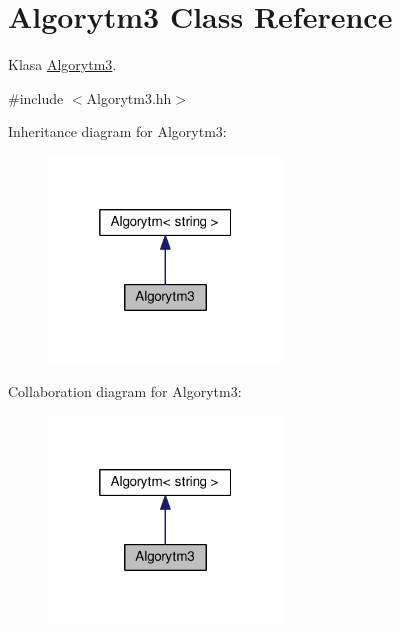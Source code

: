 \hypertarget{a00004}{}\section{Algorytm3 Class Reference}
\label{a00004}


Klasa \hyperlink{a00004}{Algorytm3}.  




{\ttfamily \#include $<$Algorytm3.\+hh$>$}



Inheritance diagram for Algorytm3\+:
\nopagebreak
\begin{figure}[H]
\begin{center}
\leavevmode
\includegraphics[width=176pt]{a00124}
\end{center}
\end{figure}


Collaboration diagram for Algorytm3\+:
\nopagebreak
\begin{figure}[H]
\begin{center}
\leavevmode
\includegraphics[width=176pt]{a00125}
\end{center}
\end{figure}
